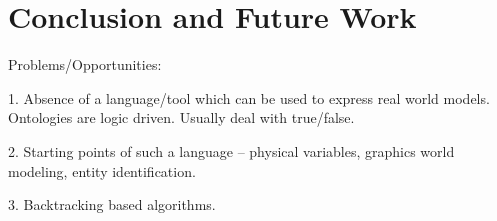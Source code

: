 \chapter{Conclusion and Future Work}

Problems/Opportunities:

  1. Absence of a language/tool which can be used to express real world models. Ontologies are logic driven. Usually deal with true/false.

  2. Starting points of such a language -- physical variables, graphics world modeling, entity identification.

  3. Backtracking based algorithms.
